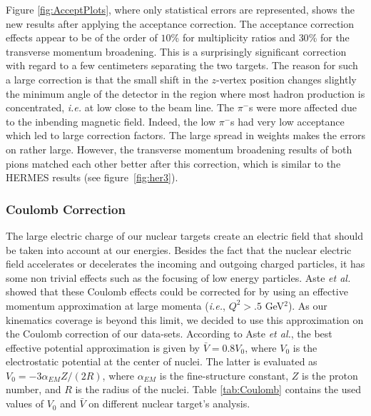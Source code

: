 Figure \ref{fig:AcceptPlots}, where only statistical errors are 
represented, shows the new results after applying the acceptance correction.
The acceptance correction effects appear to be of the order of $10$\% for 
multiplicity ratios and $30$\% for the transverse momentum broadening. This 
is a surprisingly significant correction with regard to a few centimeters 
separating the two targets. The reason for such a large correction is that 
the small shift in the $z$-vertex position changes slightly the minimum 
angle of the detector in the region where most hadron production is 
concentrated, {\it i.e.} at low \pt close to the beam line. The 
$\pi^-$s were more affected due to the inbending magnetic field. Indeed, 
the low \pt $\pi^-$s had very low acceptance which led to large correction 
factors. The large spread in weights makes the errors on \dpt rather large. 
However, the transverse momentum broadening 
results of both pions matched each other better after this correction, which is similar 
to the HERMES results (see figure~\ref{fig:her3}).

\subsubsection{Coulomb Correction}
\label{CCor}

The large electric charge of our nuclear targets create an electric field that 
should be taken into account at our energies. Besides the fact that the nuclear 
electric field accelerates or decelerates the incoming and outgoing charged 
particles, it has some non trivial effects such as the focusing of low energy 
particles. Aste {\it et al.}~\cite{Aste:2005wc} showed that these Coulomb 
effects could be corrected for by using an effective momentum approximation at 
large momenta ({\it i.e.}, $Q^2>.5$ GeV$^2$). As our kinematics coverage is 
beyond this limit, we decided to use this approximation on the Coulomb 
correction of our data-sets. According to Aste {\it et al.}, the best effective 
potential approximation is given by $\bar V= 0.8 V_0$, where $V_0$ is the 
electrostatic potential at the center of nuclei. The latter is evaluated as 
$V_0= -3 \alpha_{EM} Z / (2 R)$, where $\alpha_{EM}$ is the fine-structure 
constant, $Z$ is the proton number, and $R$ is the radius of the nuclei. Table 
\ref{tab:Coulomb} contains the used values of $V_0$ and $\bar V$ on different 
nuclear target's analysis.

